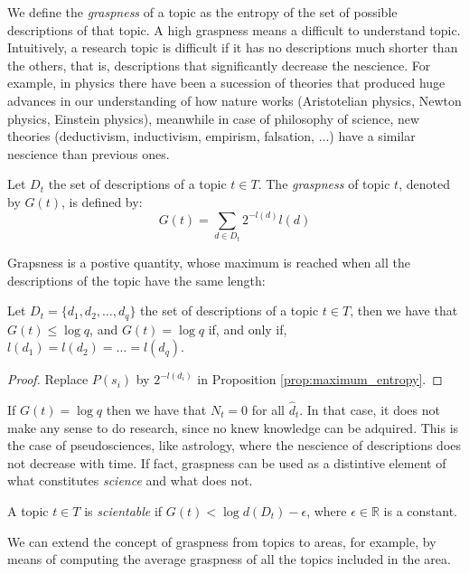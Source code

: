 We define the \emph{graspness} of a topic as the entropy of the set of possible descriptions of that topic. A high graspness means a difficult to understand topic. Intuitively, a research topic is difficult if it has no descriptions much shorter than the others, that is, descriptions that significantly decrease the nescience. For example, in physics there have been a sucession of theories that produced huge advances in our understanding of how nature works (Aristotelian physics, Newton physics, Einstein physics), meanwhile in case of philosophy of science, new theories (deductivism, inductivism, empirism, falsation, ...) have a similar nescience than previous ones.

\begin{definition}[Graspness]
Let $D_t$ the set of descriptions of a topic $t \in T$. The \emph{graspness} of topic $t$, denoted by $G(t)$, is defined by:
\[
G(t) = \sum_{d \in D_t} 2^{-l(d)} l(d)
\]
\end{definition}

Grapsness is a postive quantity, whose maximum is reached when all the descriptions of the topic have the same length:

\begin{proposition}
Let $D_t = \{ d_1, d_2, \ldots, d_q \}$ the set of descriptions of a topic $t \in T$, then we have that $G(t) \leq \log q$, and $G(t) = \log q$ if, and only if, $l(d_1) = l(d_2) = \ldots = l(d_q)$.
\end{proposition}
\begin{proof}
Replace $P(s_i)$ by $2^{-l(d_i)}$ in Proposition \ref{prop:maximum_entropy}.
\end{proof}

If $G(t) = \log q$ then we have that $N_t = 0$ for all $\hat{d}_t$. In that case, it does not make any sense to do research, since no knew knowledge can be adquired. This is the case of pseudosciences, like astrology, where the nescience of descriptions does not decrease with time. If fact, graspness can be used as a distintive element of what constitutes \emph{science} and what does not.

\begin{definition}
A topic $t \in T$ is \emph{scientable} if $G(t) < \log d(D_t) - \epsilon$, where $\epsilon \in \mathbb{R}$ is a constant.
\end{definition}

We can extend the concept of graspness from topics to areas, for example, by means of computing the average graspness of all the topics included in the area.

